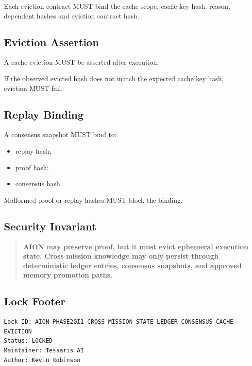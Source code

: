 Each eviction contract MUST bind the cache scope, cache key hash, reason, dependent hashes and eviction contract hash.

\subsection{Eviction Assertion}

A cache eviction MUST be asserted after execution.

If the observed evicted hash does not match the expected cache key hash, eviction MUST fail.

\subsection{Replay Binding}

A consensus snapshot MUST bind to:

\begin{itemize}
  \item replay hash;
  \item proof hash;
  \item consensus hash.
\end{itemize}

Malformed proof or replay hashes MUST block the binding.

\subsection{Security Invariant}

\begin{quote}
\textbf{AION may preserve proof, but it must evict ephemeral execution state. Cross-mission knowledge may only persist through deterministic ledger entries, consensus snapshots, and approved memory promotion paths.}
\end{quote}

\subsection{Lock Footer}

\begin{verbatim}
Lock ID: AION-PHASE20I1-CROSS-MISSION-STATE-LEDGER-CONSENSUS-CACHE-EVICTION
Status: LOCKED
Maintainer: Tessaris AI
Author: Kevin Robinson
\end{verbatim}
